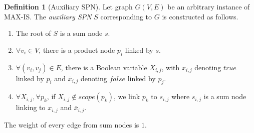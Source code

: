 \documentclass{article}
\theoremstyle{remark}
\theoremstyle{definition}
\newtheorem{definition}{Definition}[section]
\begin{document}
\theoremstyle{definition}
\begin{definition}[Auxiliary SPN]
\label{thm:auxspn}
Let graph $G(V, E)$ be an arbitrary instance of MAX-IS. The \textit{auxiliary SPN} $S$ corresponding to $G$ is constructed as follows. 
\begin{enumerate}
    \item The root of $S$ is a sum node $s$. 
    \item $\forall v_i \in V$, there is a product node $p_i$ linked by $s$.
    \item $\forall (v_i, v_j) \in E$, there is a Boolean variable $X_{i,j}$, with $x_{i,j}$ denoting $true$ linked by $p_i$ and $\overline x_{i,j}$ denoting $false$ linked by $p_j$.
    \item $\forall X_{i, j}, \forall p_k$, if $X_{i, j} \notin scope(p_k)$, we link $p_k$ to $s_{i, j}$ where $s_{i, j}$ is a sum node linking to $x_{i, j}$ and $\overline x_{i, j}$.
\end{enumerate}
The weight of every edge from sum nodes is $1$.
\end{definition}
\end{document}
